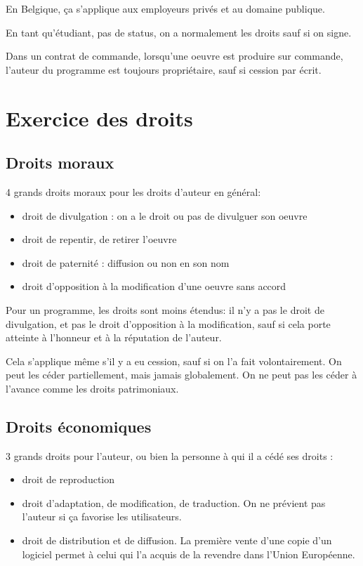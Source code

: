 	En Belgique, ça s'applique aux employeurs privés et au domaine publique.
	
	En tant qu'étudiant, pas de status, on a normalement les droits sauf si on signe.
	
	Dans un contrat de commande, lorsqu'une oeuvre est produire sur commande, l'auteur du programme est toujours propriétaire, sauf si cession par écrit.
	
	\section{Exercice des droits}
	
		\subsection{Droits moraux}
		
		4 grands droits moraux pour les droits d'auteur en général:
		
		\begin{itemize}
			\item droit de divulgation : on a le droit ou pas de divulguer son oeuvre
			\item droit de repentir, de retirer l'oeuvre
			\item droit de paternité : diffusion ou non en son nom
			\item droit d'opposition à la modification d'une oeuvre sans accord
		\end{itemize}
	
		Pour un programme, les droits sont moins étendus: il n'y a pas le droit de divulgation, et pas le droit d'opposition à la modification, sauf si cela porte atteinte à l'honneur et à la réputation de l'auteur.
	
		Cela s'applique même s'il y a eu cession, sauf si on l'a fait volontairement. On peut les céder partiellement, mais jamais globalement. On ne peut pas les céder à l'avance comme les droits patrimoniaux.
		
		
		\subsection{Droits économiques}
		
		3 grands droits pour l'auteur, ou bien la personne à qui il a cédé ses droits :
		
		\begin{itemize}
			\item droit de reproduction
			\item droit d'adaptation, de modification, de traduction. On ne prévient pas l'auteur si ça favorise les utilisateurs.
			\item droit de distribution et de diffusion. La première vente d'une copie d'un logiciel permet à celui qui l'a acquis de la revendre dans l'Union Européenne.
		\end{itemize}
		
